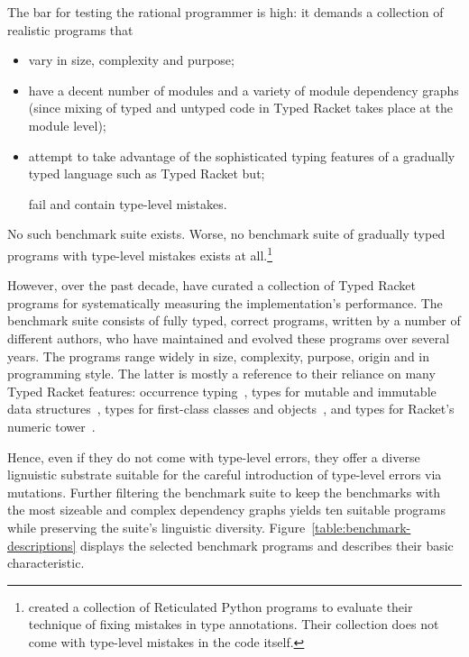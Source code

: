 
The bar for testing the rational programmer is high: it demands a
collection of realistic programs that
\begin{itemize}
   
  \item vary in size, complexity and purpose; 
    
  \item  have a decent number of modules and a variety of module
    dependency graphs (since mixing of typed and untyped code in Typed
    Racket takes place at the module level);  

  \item attempt to take  advantage of the sophisticated typing features of
    a gradually typed language such as Typed Racket but;

   \itme  fail and contain type-level mistakes. 
\end{itemize}

No such benchmark suite exists.  Worse, no benchmark suite of
gradually typed programs with type-level mistakes exists at
all.\footnote{\citet{cc-oopsla-20} created a collection of Reticulated
Python programs to evaluate their technique of fixing mistakes in type
annotations. Their collection does not come with type-level mistakes
in the code itself.} 


However, over the past decade,  \citet{gtnffvf-jfp-2019} have curated a
collection of Typed Racket programs for systematically measuring the
implementation's performance. The benchmark suite consists of fully typed,
correct programs, written by a number of different authors, who have
maintained and evolved these programs over several years. The programs
range widely in size, complexity, purpose, origin and in programming
style. The latter is mostly a reference to their reliance on many Typed
Racket features: occurrence typing~\cite{tf-icfp-2010}, types for mutable
and immutable data structures~\cite{hpst-sfp-2010}, types for first-class
classes and objects~\cite{tsdtf-oopsla-2012}, and types for Racket's
numeric tower~\cite{stathff-padl-12}. 


Hence, even if they do not come with type-level errors, they offer a
diverse lignuistic substrate suitable for the careful introduction of
type-level errors via mutations. Further filtering the benchmark suite to
keep the benchmarks with the most sizeable and complex dependency graphs
yields ten suitable programs while preserving the suite's linguistic
diversity. Figure~\ref{table:benchmark-descriptions} displays the selected
benchmark programs and describes their basic characteristic. 
